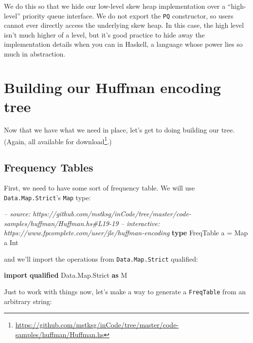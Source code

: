 \documentclass[]{article}
\newenvironment{Shaded}{\begin{snugshade}}{\end{snugshade}}
\newcommand{\CommentTok}[1]{\textcolor[rgb]{0.56,0.35,0.01}{\textit{#1}}}
\newcommand{\DataTypeTok}[1]{\textcolor[rgb]{0.13,0.29,0.53}{#1}}
\newcommand{\FunctionTok}[1]{\textcolor[rgb]{0.00,0.00,0.00}{#1}}
\newcommand{\KeywordTok}[1]{\textcolor[rgb]{0.13,0.29,0.53}{\textbf{#1}}}
\newcommand{\NormalTok}[1]{#1}
\renewcommand{\href}[2]{#2\footnote{\url{#1}}}
\begin{document}
We do this so that we hide our low-level skew heap implementation over a
``high-level'' priority queue interface. We do not export the \texttt{PQ}
constructor, so users cannot ever directly access the underlying skew heap. In
this case, the high level isn't much higher of a level, but it's good practice
to hide away the implementation details when you can in Haskell, a language
whose power lies so much in abstraction.

\hypertarget{building-our-huffman-encoding-tree}{%
\section{Building our Huffman encoding
tree}\label{building-our-huffman-encoding-tree}}

Now that we have what we need in place, let's get to doing building our tree.
(Again, all available
\href{https://github.com/mstksg/inCode/tree/master/code-samples/huffman/Huffman.hs}{for
download}.)

\hypertarget{frequency-tables}{%
\subsection{Frequency Tables}\label{frequency-tables}}

First, we need to have some sort of frequency table. We will use
\texttt{Data.Map.Strict}'s \texttt{Map} type:

\begin{Shaded}
\begin{Highlighting}[]
\CommentTok{-- source: https://github.com/mstksg/inCode/tree/master/code-samples/huffman/Huffman.hs#L19-19}
\CommentTok{-- interactive: https://www.fpcomplete.com/user/jle/huffman-encoding}
\KeywordTok{type} \DataTypeTok{FreqTable}\NormalTok{ a }\FunctionTok{=} \DataTypeTok{Map}\NormalTok{ a }\DataTypeTok{Int}
\end{Highlighting}
\end{Shaded}

and we'll import the operations from \texttt{Data.Map.Strict} qualified:

\begin{Shaded}
\begin{Highlighting}[]
\KeywordTok{import} \KeywordTok{qualified} \DataTypeTok{Data.Map.Strict} \KeywordTok{as} \DataTypeTok{M}
\end{Highlighting}
\end{Shaded}

Just to work with things now, let's make a way to generate a \texttt{FreqTable}
from an arbitrary string:
\end{document}
